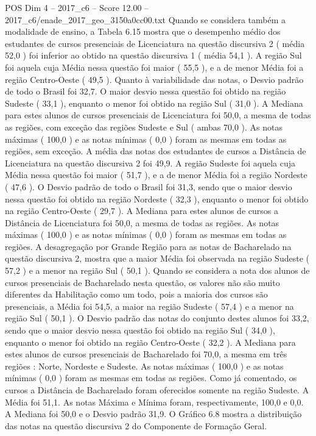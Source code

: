 \begin{textsample}{POS Dim 4 – 2017\_c6 – Score 12.00 – 2017\_c6/enade\_2017\_geo\_3150a0cc00.txt}
Quando se considera também a modalidade de ensino, a Tabela 6.15 mostra que o desempenho médio dos estudantes de cursos presenciais de Licenciatura na questão discursiva 2 ( média 52,0 ) foi inferior ao obtido na questão discursiva 1 ( média 54,1 ).
A região Sul foi aquela cuja Média nessa questão foi maior ( 55,5 ), e a de menor Média foi a região Centro-Oeste ( 49,5 ).
Quanto à variabilidade das notas, o Desvio padrão de todo o Brasil foi 32,7.
O maior desvio nessa questão foi obtido na região Sudeste ( 33,1 ), enquanto o menor foi obtido na região Sul ( 31,0 ).
A Mediana para estes alunos de cursos presenciais de Licenciatura foi 50,0, a mesma de todas as regiões, com exceção das regiões Sudeste e Sul ( ambas 70,0 ).
As notas máximas ( 100,0 ) e as notas mínimas ( 0,0 ) foram as mesmas em todas as regiões, sem exceção.
A média das notas dos estudantes de cursos a Distância de Licenciatura na questão discursiva 2 foi 49,9.
A região Sudeste foi aquela cuja Média nessa questão foi maior ( 51,7 ), e a de menor Média foi a região Nordeste ( 47,6 ).
O Desvio padrão de todo o Brasil foi 31,3, sendo que o maior desvio nessa questão foi obtido na região Nordeste ( 32,3 ), enquanto o menor foi obtido na região Centro-Oeste ( 29,7 ).
A Mediana para estes alunos de cursos a Distância de Licenciatura foi 50,0, a mesma de todas as regiões.
As notas máximas ( 100,0 ) e as notas mínimas ( 0,0 ) foram as mesmas em todas as regiões.
A desagregação por Grande Região para as notas de Bacharelado na questão discursiva 2, mostra que a maior Média foi observada na região Sudeste ( 57,2 ) e a menor na região Sul ( 50,1 ).
Quando se considera a nota dos alunos de cursos presenciais de Bacharelado nesta questão, os valores não são muito diferentes da Habilitação como um todo, pois a maioria dos cursos são presenciais, a Média foi 54,5, a maior na região Sudeste ( 57,4 ) e a menor na região Sul ( 50,1 ).
O Desvio padrão das notas do conjunto destes alunos foi 33,2, sendo que o maior desvio nessa questão foi obtido na região Sul ( 34,0 ), enquanto o menor foi obtido na região Centro-Oeste ( 32,2 ).
A Mediana para estes alunos de cursos presenciais de Bacharelado foi 70,0, a mesma em três regiões : Norte, Nordeste e Sudeste.
As notas máximas ( 100,0 ) e as notas mínimas ( 0,0 ) foram as mesmas em todas as regiões.
Como já comentado, os cursos a Distância de Bacharelado foram oferecidos somente na região Sudeste.
A Média foi 51,1.
As notas Máxima e Mínima foram, respectivamente, 100,0 e 0,0.
A Mediana foi 50,0 e o Desvio padrão 31,9.
O Gráfico 6.8 mostra a distribuição das notas na questão discursiva 2 do Componente de Formação Geral.

\end{textsample}
